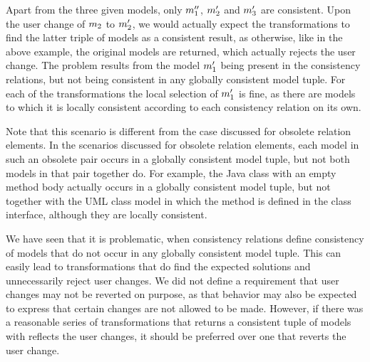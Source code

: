 Apart from the three given models, only $m_{1}''$, $m_{2}'$ and $m_{3}'$ are consistent.
Upon the user change of $m_{2}$ to $m_{2}'$, we would actually expect the transformations to find the latter triple of models as a consistent result, as otherwise, like in the above example, the original models are returned, which actually rejects the user change.
The problem results from the model $m_{1}'$ being present in the consistency relations, but not being consistent in any globally consistent model tuple.
For each of the transformations the local selection of $m_{1}'$ is fine, as there are models to which it is locally consistent according to each consistency relation on its own.

Note that this scenario is different from the case discussed for obsolete relation elements.
In the scenarios discussed for obsolete relation elements, each model in such an obsolete pair occurs in a globally consistent model tuple, but not both models in that pair together do.
For example, the Java class with an empty method body actually occurs in a globally consistent model tuple, but not together with the UML class model in which the method is defined in the class interface, although they are locally consistent.

We have seen that it is problematic, when consistency relations define consistency of models that do not occur in any globally consistent model tuple.
This can easily lead to transformations that do find the expected solutions and unnecessarily reject user changes.
We did not define a requirement that user changes may not be reverted on purpose, as that behavior may also be expected to express that certain changes are not allowed to be made.
However, if there was a reasonable series of transformations that returns a consistent tuple of models with reflects the user changes, it should be preferred over one that reverts the user change.

